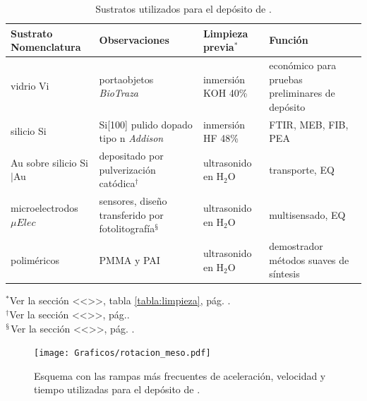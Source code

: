 					
			 	    \begin{table}[ht!]
			  		   \caption[Sustratos utilizados para el depósito de \pdm]{Sustratos utilizados para el depósito de \pdm.} 
			  		   \begin{tabular}{>{\raggedright\arraybackslash}m{2.4cm}>{\raggedright\arraybackslash}m{2.5cm}>{\raggedright\arraybackslash}m{2cm}>{\raggedright\arraybackslash}m{3.55cm}} 
			  		   \toprule
					   Sustrato Nomenclatura   & Observaciones  & Limpieza previa$^*$ & Función \\ \midrule
			       	   vidrio \hspace{2cm} Vi  &	portaobjetos \textit{BioTraza} & inmersión KOH 40\% & económico para pruebas preliminares de depósito \\ \midrule
			       	   silicio\hspace{2cm} Si  & Si[100] pulido dopado tipo n  \textit{Addison}& inmersión HF 48\% & FTIR, MEB, FIB, PEA \\ \midrule
			       	   Au sobre silicio\hspace{2cm} Si$|$Au & depositado por pulverización catódica$^\dagger$  & ultrasonido en H$_2$O  & transporte, EQ\\ \midrule
			      	   microelectrodos \hspace{2cm} $\mu Elec$ & sensores, diseño transferido por fotolitografía$^\mathsection$  	  &  ultrasonido en H$_2$O  & multisensado, EQ \\ \midrule
			      	   poliméricos         &  PMMA y PAI		  &  ultrasonido en H$_2$O &  demostrador métodos suaves de síntesis\\ 
			      	   \bottomrule
			    	   \end{tabular}\vspace*{2pt}
			    	   \footnotesize{$^*$Ver la sección <<>>, tabla \ref{tabla:limpieza}, pág. \pageref{sec:limpieza}.}\\
			    	   \footnotesize{$^\dagger$Ver la sección <<>>, pág.\pageref{sec:sputt}.} \\
			    	   \footnotesize{$^\mathsection$Ver la sección <<>>, pág. \pageref{sec:sputt}.}
			    	   \label{tabla:sustratos}
			   		   \end{table}

			   		   \begin{figure}[!ht]
						 \begin{center}
						 \texttt{[image: Graficos/rotacion\_meso.pdf]}
						 \caption[Parámetros de depósito para las \pdm]{Esquema con las rampas más frecuentes de aceleración, velocidad y tiempo utilizadas para el depósito de \pdm.}
						 \label{fig:rampa-spin}
						 \end{center}
						 \end{figure}
			
